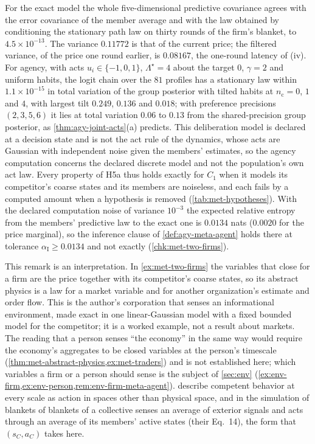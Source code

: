 For the exact model the whole five-dimensional predictive covariance agrees with the error covariance of the member average and with the law obtained by conditioning the stationary path law on thirty rounds of the firm's blanket, to $4.5\times10^{-13}$. The variance $0.11772$ is that of the current price; the filtered variance, of the price one round earlier, is $0.08167$, the one-round latency of (iv). For agency, with acts $u_i\in\{-1,0,1\}$, $\Lambda^\star=4$ about the target $0$, $\gamma=2$ and uniform habits, the logit chain over the $81$ profiles has a stationary law within $1.1\times10^{-15}$ in total variation of the group posterior with tilted habits at $n_{\mathrm c}=0$, $1$ and $4$, with largest tilt $0.249$, $0.136$ and $0.018$; with preference precisions $(2,3,5,6)$ it lies at total variation $0.06$ to $0.13$ from the shared-precision group posterior, as \cref{thm:agy-joint-acts}(a) predicts. This deliberation model is declared at a decision state and is not the act rule of the dynamics, whose acts are Gaussian with independent noise given the members' estimates, so the agency computation concerns the declared discrete model and not the population's own act law. Every property of H5a thus holds exactly for $C_1$ when it models its competitor's coarse states and its members are noiseless, and each fails by a computed amount when a hypothesis is removed (\cref{tab:met-hypotheses}). With the declared computation noise of variance $10^{-3}$ the expected relative entropy from the members' predictive law to the exact one is $0.0134$ nats ($0.0020$ for the price marginal), so the inference clause of \cref{def:agy-meta-agent} holds there at tolerance $\alpha_{\mathrm I}\ge0.0134$ and not exactly (\cref{chk:met-two-firms}).

\begin{remark}\label{rem:met-corporation}
This remark is an interpretation. In \cref{ex:met-two-firms} the variables that close for a firm are the price together with its competitor's coarse states, so its abstract physics is a law for a market variable and for another organization's estimate and order flow. This is the author's corporation that senses an informational environment, made exact in one linear-Gaussian model with a fixed bounded model for the competitor; it is a worked example, not a result about markets. The reading that a person senses ``the economy'' in the same way would require the economy's aggregates to be closed variables at the person's timescale (\cref{thm:met-abstract-physics,ex:met-traders}) and is not established here; which variables a firm or a person should sense is the subject of \cref{sec:env} (\cref{ex:env-firm,ex:env-person,rem:env-firm-meta-agent}).  describe competent behavior at every scale as action in spaces other than physical space, and in the simulation of blankets of blankets of \citet{palacios2020markov} a collective senses an average of exterior signals and acts through an average of its members' active states (their Eq.~14), the form that $(s_C,a_C)$ takes here.
\end{remark}

